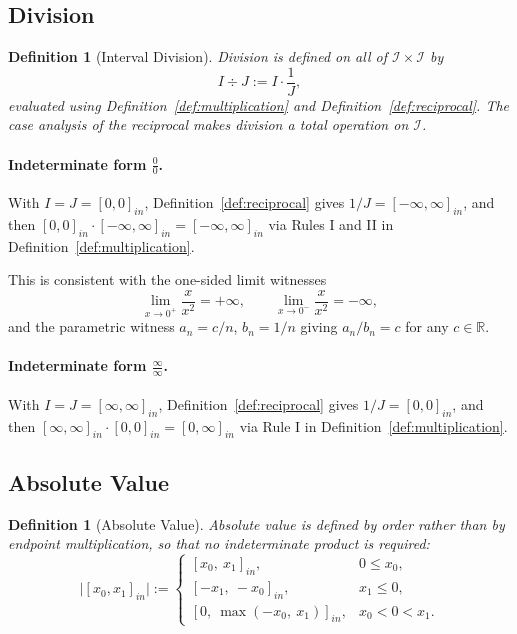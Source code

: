 \documentclass[11pt,a4paper]{article}
\theoremstyle{paperdef}
\newtheorem{definition}[theorem]{Definition}
\newcommand{\Iset}{\mathcal{I}}
\newcommand{\inI}[1]{[#1]_{in}}
\begin{document}
\subsection{Division}\label{sec:division}

\begin{definition}[Interval Division]\label{def:division}
Division is defined on all of $\Iset \times \Iset$ by
\[
I \div J := I \cdot \frac{1}{J},
\]
evaluated using Definition~\ref{def:multiplication} and
Definition~\ref{def:reciprocal}. The case analysis of the reciprocal
makes division a total operation on $\Iset$.
\end{definition}

\paragraph{Indeterminate form $\tfrac{0}{0}$.} With
$I = J = \inI{0, 0}$, Definition~\ref{def:reciprocal} gives
$1/J = \inI{-\infty, \infty}$, and then
$\inI{0, 0} \cdot \inI{-\infty, \infty} = \inI{-\infty, \infty}$ via
Rules I and II in Definition~\ref{def:multiplication}.

This is consistent with the one-sided limit witnesses
\[
\lim_{x \to 0^{+}} \frac{x}{x^{2}} = +\infty, \qquad
\lim_{x \to 0^{-}} \frac{x}{x^{2}} = -\infty,
\]
and the parametric witness $a_n = c/n$, $b_n = 1/n$ giving
$a_n / b_n = c$ for any $c \in \mathbb{R}$.

\paragraph{Indeterminate form $\tfrac{\infty}{\infty}$.} With
$I = J = \inI{\infty, \infty}$, Definition~\ref{def:reciprocal} gives
$1/J = \inI{0, 0}$, and then
$\inI{\infty, \infty} \cdot \inI{0, 0} = \inI{0, \infty}$ via Rule I
in Definition~\ref{def:multiplication}.

\subsection{Absolute Value}\label{sec:absolute-value}

\begin{definition}[Absolute Value]\label{def:abs}
Absolute value is defined by order rather than by endpoint
multiplication, so that no indeterminate product is required:
\[
\lvert \inI{x_0, x_1} \rvert :=
\begin{cases}
\inI{x_0,\ x_1}, & 0 \le x_0, \\
\inI{-x_1,\ -x_0}, & x_1 \le 0, \\
\inI{0,\ \max(-x_0,\ x_1)}, & x_0 < 0 < x_1.
\end{cases}
\]
\end{definition}
\end{document}

